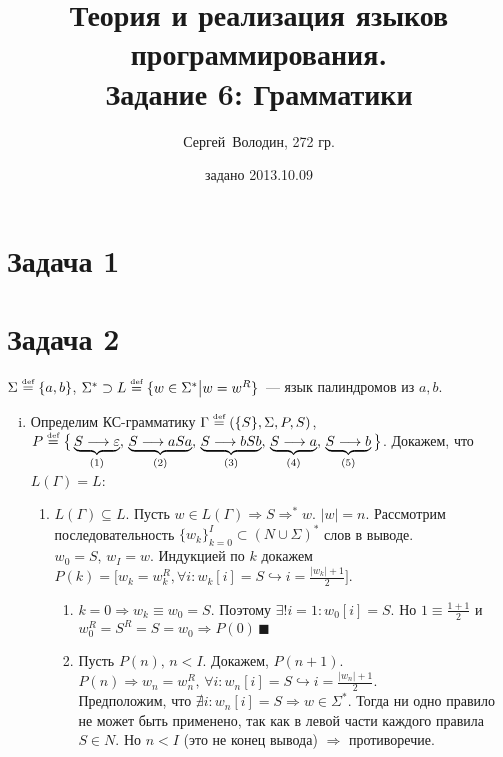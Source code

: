 \documentclass[a4paper]{article}
\title{Теория и реализация языков программирования.\\Задание 6: Грамматики}
\date{задано 2013.10.09}
\author{Сергей~Володин, 272 гр.}
\def\eqdef{\overset{\mbox{\tiny def}}{=}}
\begin{document}
\maketitle
\section*{Задача 1}
\section*{Задача 2}
$\Sigma\eqdef\{a,b\}$, $\Sigma^*\supset L\eqdef\{w\in\Sigma^*\big|w=w^R\}$~--- язык палиндромов из $a,b$.
\begin{enumerate}[i.]
\def\ansba{$\Gamma\eqdef(\{S\},\Sigma,P,S)$, $P\eqdef\big\{\underbrace{S\longrightarrow\varepsilon}_{(1)},\,\underbrace{S\longrightarrow aSa}_{(2)},\,\underbrace{S\longrightarrow bSb}_{(3)},\,\underbrace{S\longrightarrow a}_{(4)},\,\underbrace{S\longrightarrow b}_{(5)}\big\}$}
\def\ansbac{\Gamma\eqdef(\{S\},\Sigma,P,S)$, $P\eqdef\big\{S\longrightarrow\varepsilon\big|aSa\big|bSb\big|a\big|b\big\}}
\item Определим КС-грамматику \ansba.\newline
Докажем, что $L(\Gamma)=L$:
\begin{enumerate}
\item $L(\Gamma)\subseteq L$. Пусть $w\in L(\Gamma)\Rightarrow S\Longrightarrow^* w$. $|w|=n$. Рассмотрим последовательность $\{w_k\}^I_{k=0}\subset (N\cup\Sigma)^*$ слов в выводе. $w_0=S,\,w_I=w$. Индукцией по $k$ докажем $P(k)=\big[w_k=w_k^R,\forall i\colon w_k[i]=S\hookrightarrow i=\frac{|w_k|+1}{2}\big]$.\begin{enumerate}[1.]
\item $k=0\Rightarrow w_k\equiv w_0=S$. Поэтому $\exists ! i=1\colon w_0[i]=S$. Но $1\equiv\frac{1+1}{2}$ и $w_0^R=S^R=S=w_0\Rightarrow P(0)\,\blacksquare$
\item Пусть $P(n),\,n<I$. Докажем, $P(n+1)$. $P(n)\Rightarrow w_n=w_n^R,\,\forall i\colon w_n[i]=S\hookrightarrow i=\frac{|w_n|+1}{2}$.
\\[1pt]
Предположим, что $\nexists i\colon w_n[i]=S\Rightarrow w\in \Sigma^*$. Тогда ни одно правило не может быть применено, так как в левой части каждого правила $S\in N$. Но $n<I$ (это не конец вывода) $\Rightarrow$ противоречие.

\end{enumerate}
\end{enumerate}
\end{enumerate}
\end{document}
